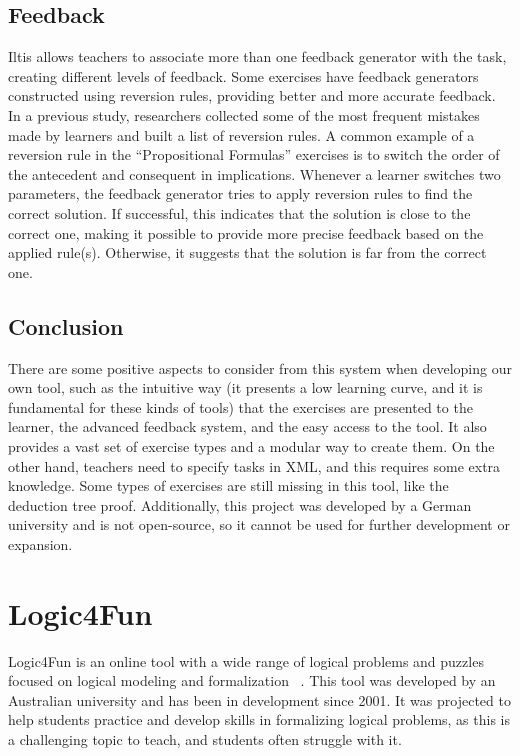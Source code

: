 \subsection{Feedback}
Iltis allows teachers to associate more than one feedback generator with the task, creating different levels of feedback. Some exercises have feedback generators constructed using reversion rules, providing better and more accurate feedback. In a previous study, researchers collected some of the most frequent mistakes made by learners and built a list of reversion rules. A common example of a reversion rule in the “Propositional Formulas” exercises is to switch the order of the antecedent and consequent in implications. Whenever a learner switches two parameters, the feedback generator tries to apply reversion rules to find the correct solution. If successful, this indicates that the solution is close to the correct one, making it possible to provide more precise feedback based on the applied rule(s). Otherwise, it suggests that the solution is far from the correct one.

\subsection{Conclusion}
There are some positive aspects to consider from this system when developing our own tool, such as the intuitive way (it presents a low learning curve, and it is fundamental for these kinds of tools) that the exercises are presented to the learner, the advanced feedback system, and the easy access to the tool. It also provides a vast set of exercise types and a modular way to create them. On the other hand, teachers need to specify tasks in XML, and this requires some extra knowledge. Some types of exercises are still missing in this tool, like the deduction tree proof. Additionally, this project was developed by a German university and is not open-source, so it cannot be used for further development or expansion.

\section{Logic4Fun}
Logic4Fun is an online tool with a wide range of logical problems and puzzles focused on logical modeling and formalization ~\cite{logic4fun}.
This tool was developed by an Australian university and has been in development since 2001. It was projected to help students practice and develop skills in formalizing logical problems, as this is a challenging topic to teach, and students often struggle with it.

